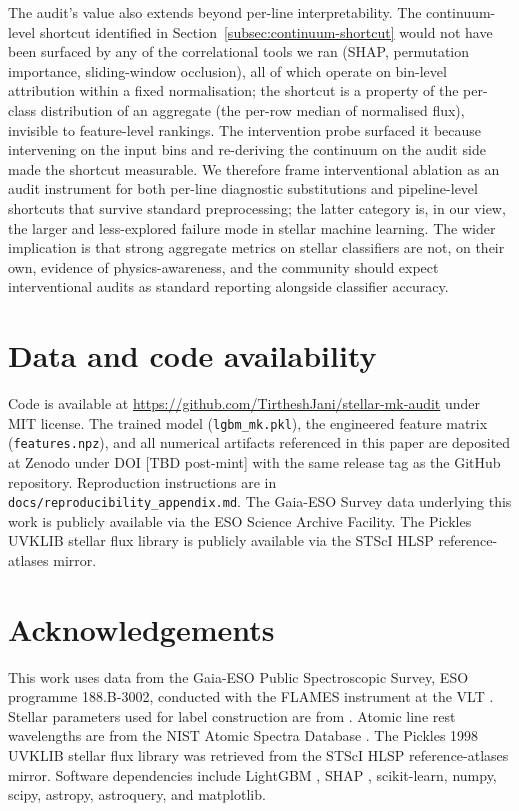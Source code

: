 \documentclass[11pt,a4paper]{article}
\begin{document}
The audit's value also extends beyond per-line interpretability. The continuum-level shortcut identified in Section~\ref{subsec:continuum-shortcut} would not have been surfaced by any of the correlational tools we ran (SHAP, permutation importance, sliding-window occlusion), all of which operate on bin-level attribution within a fixed normalisation; the shortcut is a property of the per-class distribution of an aggregate (the per-row median of normalised flux), invisible to feature-level rankings. The intervention probe surfaced it because intervening on the input bins and re-deriving the continuum on the audit side made the shortcut measurable. We therefore frame interventional ablation as an audit instrument for both per-line diagnostic substitutions and pipeline-level shortcuts that survive standard preprocessing; the latter category is, in our view, the larger and less-explored failure mode in stellar machine learning. The wider implication is that strong aggregate metrics on stellar classifiers are not, on their own, evidence of physics-awareness, and the community should expect interventional audits as standard reporting alongside classifier accuracy.

\section*{Data and code availability}

Code is available at \url{https://github.com/TirtheshJani/stellar-mk-audit} under MIT license. The trained model (\texttt{lgbm\_mk.pkl}), the engineered feature matrix (\texttt{features.npz}), and all numerical artifacts referenced in this paper are deposited at Zenodo under DOI [TBD post-mint] with the same release tag as the GitHub repository. Reproduction instructions are in \texttt{docs/reproducibility\_appendix.md}. The Gaia-ESO Survey data underlying this work is publicly available via the ESO Science Archive Facility. The Pickles UVKLIB stellar flux library is publicly available via the STScI HLSP reference-atlases mirror.

\section*{Acknowledgements}

This work uses data from the Gaia-ESO Public Spectroscopic Survey, ESO programme 188.B-3002, conducted with the FLAMES instrument at the VLT \citep{2022A&A...666A.120G,2014A&A...565A.113S}. Stellar parameters used for label construction are from \citet{2023A&A...676A.129H}. Atomic line rest wavelengths are from the NIST Atomic Spectra Database \citep{NIST_ASD_2023}. The Pickles 1998 UVKLIB stellar flux library was retrieved from the STScI HLSP reference-atlases mirror. Software dependencies include LightGBM \citep{Ke2017LightGBM}, SHAP \citep{LundbergLee2017SHAP}, scikit-learn, numpy, scipy, astropy, astroquery, and matplotlib.
\end{document}
